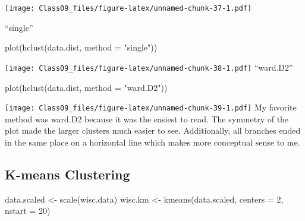 \documentclass[
]{article}
\newenvironment{Shaded}{\begin{snugshade}}{\end{snugshade}}
\newcommand{\AttributeTok}[1]{\textcolor[rgb]{0.77,0.63,0.00}{#1}}
\newcommand{\DecValTok}[1]{\textcolor[rgb]{0.00,0.00,0.81}{#1}}
\newcommand{\FunctionTok}[1]{\textcolor[rgb]{0.00,0.00,0.00}{#1}}
\newcommand{\NormalTok}[1]{#1}
\newcommand{\OtherTok}[1]{\textcolor[rgb]{0.56,0.35,0.01}{#1}}
\newcommand{\SpecialCharTok}[1]{\textcolor[rgb]{0.00,0.00,0.00}{#1}}
\newcommand{\StringTok}[1]{\textcolor[rgb]{0.31,0.60,0.02}{#1}}
\begin{document}
\texttt{[image: Class09\_files/figure-latex/unnamed-chunk-37-1.pdf]}

``single''

\begin{Shaded}
\begin{Highlighting}[]
\FunctionTok{plot}\NormalTok{(}\FunctionTok{hclust}\NormalTok{(data.dist, }\AttributeTok{method =} \StringTok{"single"}\NormalTok{))}
\end{Highlighting}
\end{Shaded}

\texttt{[image: Class09\_files/figure-latex/unnamed-chunk-38-1.pdf]}
``ward.D2''

\begin{Shaded}
\begin{Highlighting}[]
\FunctionTok{plot}\NormalTok{(}\FunctionTok{hclust}\NormalTok{(data.dist, }\AttributeTok{method =} \StringTok{"ward.D2"}\NormalTok{))}
\end{Highlighting}
\end{Shaded}

\texttt{[image: Class09\_files/figure-latex/unnamed-chunk-39-1.pdf]} My
favorite method was ward.D2 because it was the easiest to read. The
symmetry of the plot made the larger clusters much easier to see.
Additionally, all branches ended in the same place on a horizontal line
which makes more conceptual sense to me.

\hypertarget{k-means-clustering}{%
\subsection{K-means Clustering}\label{k-means-clustering}}

\begin{Shaded}
\begin{Highlighting}[]
\NormalTok{data.scaled }\OtherTok{\textless{}{-}} \FunctionTok{scale}\NormalTok{(wisc.data)}
\NormalTok{wisc.km }\OtherTok{\textless{}{-}} \FunctionTok{kmeans}\NormalTok{(data.scaled, }\AttributeTok{centers =} \DecValTok{2}\NormalTok{, }\AttributeTok{nstart =} \DecValTok{20}\NormalTok{)}
\end{Highlighting}
\end{Shaded}

\begin{Shaded}
\end{Shaded}
\end{document}
